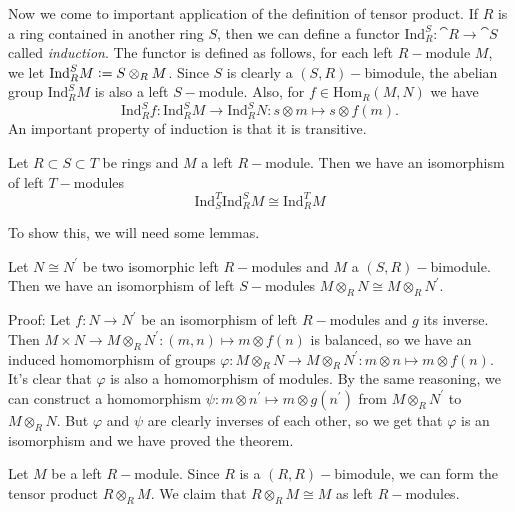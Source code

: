 Now we come to important application of the definition of tensor product. If $R$ is a ring contained in another ring $S$, then we can define a functor $\text{Ind}_R^S:\cat{R}\rightarrow\cat{S}$ called \textit{induction}. The functor is defined as follows, for each left $R-$module $M$, we let  $\text{Ind}_R^SM\bydef S\otimes_RM$. Since $S$ is clearly a $(S,R)-$bimodule, the abelian group $\text{Ind}_R^SM$ is also a left $S-$module. Also, for $f\in\text{Hom}_R(M,N)$ we have 
\begin{equation}
    \text{Ind}_R^Sf:\text{Ind}_R^SM\rightarrow\text{Ind}_R^SN:s\otimes m\mapsto s\otimes f(m).
\end{equation}
An important property of induction is that it is transitive.
\begin{dang}
    \begin{theorem}\label{theorem: associativity of the induction functor}
        Let $R\subset S\subset T$ be rings and $M$ a left $R-$module. Then we have an isomorphism of left $T-$modules
        \begin{equation}
            \text{Ind}_S^T\text{Ind}_R^SM\cong\text{Ind}_R^TM
        \end{equation}
    \end{theorem}
\end{dang}
To show this, we will need some lemmas.
\begin{dang}
    \begin{lemma}\label{lemma: M otimes N isomorphic to M otimes N'}
        Let $N\cong N^\prime$ be two isomorphic left $R-$modules and $M$ a $(S,R)-$bimodule. Then we have an isomorphism of left $S-$modules $M\otimes_RN\cong M\otimes_RN^\prime$.
    \end{lemma}
\end{dang}
Proof: Let $f:N\rightarrow N^\prime$ be an isomorphism of left $R-$modules and $g$ its inverse. Then $M\times N\rightarrow M\otimes_R N^\prime:(m,n)\mapsto m\otimes f(n)$ is balanced, so we have an induced homomorphism of groups $\varphi:M\otimes_R N\rightarrow M\otimes_R N^\prime:m\otimes n\mapsto m\otimes f(n)$. It's clear that $\varphi$ is also a homomorphism of modules. By the same reasoning, we can construct a homomorphism $\psi: m\otimes n^\prime\mapsto m\otimes g(n^\prime)$ from $M\otimes_RN^\prime$ to $M\otimes_RN$. But $\varphi$ and $\psi$ are clearly inverses of each other, so we get that $\varphi$ is an isomorphism and we have proved the theorem.
\begin{dang}
    \begin{lemma}\label{lemma: R otimes S is isomorphic to S}
        Let $M$ be a left $R-$module. Since $R$ is a $(R,R)-$bimodule, we can form the tensor product $R\otimes_R M$. We claim that $R\otimes_RM\cong M$ as left $R-$modules.
    \end{lemma}
\end{dang}
